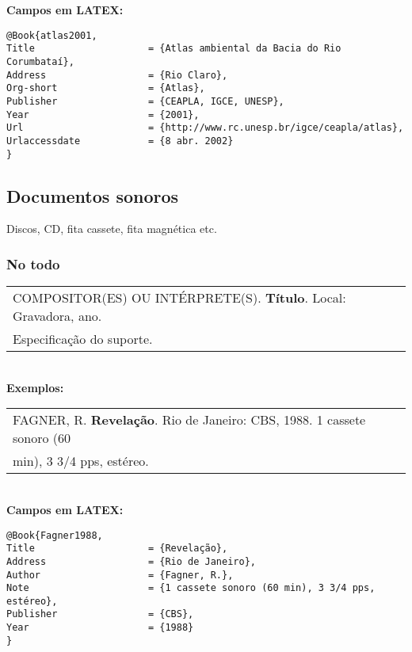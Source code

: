 \textbf{Campos em LATEX:} 
	
\begingroup
\fontsize{10pt}{12pt}\selectfont
\begin{verbatim}
@Book{atlas2001,
Title                    = {Atlas ambiental da Bacia do Rio Corumbataí},
Address                  = {Rio Claro},
Org-short                = {Atlas},
Publisher                = {CEAPLA, IGCE, UNESP},
Year                     = {2001},
Url                      = {http://www.rc.unesp.br/igce/ceapla/atlas},
Urlaccessdate            = {8 abr. 2002}
}
\end{verbatim}
\endgroup
	
\subsection{Documentos sonoros}
	
Discos, CD, fita cassete, fita magnética etc. \\
\subsubsection{No todo}
	
\begin{tabular}{|l|c|} \hline
	COMPOSITOR(ES) OU INTÉRPRETE(S). \textbf{Título}. Local: Gravadora, ano. \\
	Especificação do suporte.                                                
	                                                                           \\\hline
\end{tabular} \\
	
\textbf{Exemplos:} \\
	
\begin{tabular}{|l|c|} \hline
	FAGNER, R. \textbf{Revelação}. Rio de Janeiro: CBS, 1988. 1 cassete sonoro (60 \\
	min), 3 3/4 pps, estéreo.                                                       
	                                                                                 \\\hline
\end{tabular} \\
	
\textbf{Campos em LATEX:} 
	
\begingroup
\fontsize{10pt}{12pt}\selectfont
\begin{verbatim}
@Book{Fagner1988,
Title                    = {Revelação},
Address                  = {Rio de Janeiro},
Author                   = {Fagner, R.},
Note                     = {1 cassete sonoro (60 min), 3 3/4 pps, 
estéreo},
Publisher                = {CBS},
Year                     = {1988}
}
\end{verbatim}
\endgroup
	
